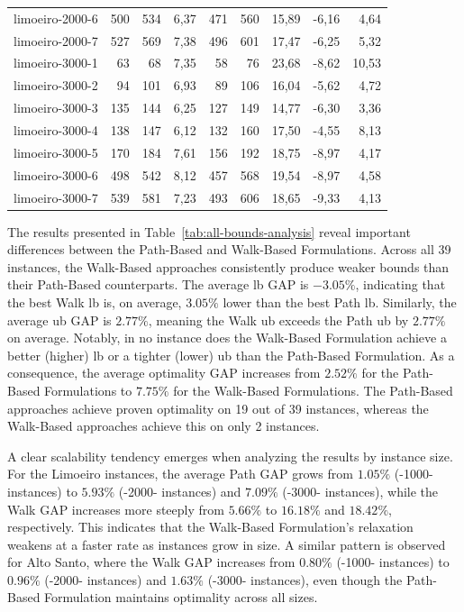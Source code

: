 \begin{table}[ht!]
{\begin{tabular}{lrrrrrrrr}
			limoeiro-2000-6                       & 500 & 534 & 6,37 & 471 & 560 & 15,89 & -6,16  & 4,64  \\
			limoeiro-2000-7                       & 527 & 569 & 7,38 & 496 & 601 & 17,47 & -6,25  & 5,32  \\
			limoeiro-3000-1                       & 63  & 68  & 7,35 & 58  & 76  & 23,68 & -8,62  & 10,53 \\
			limoeiro-3000-2                       & 94  & 101 & 6,93 & 89  & 106 & 16,04 & -5,62  & 4,72  \\
			limoeiro-3000-3                       & 135 & 144 & 6,25 & 127 & 149 & 14,77 & -6,30  & 3,36  \\
			limoeiro-3000-4                       & 138 & 147 & 6,12 & 132 & 160 & 17,50 & -4,55  & 8,13  \\
			limoeiro-3000-5                       & 170 & 184 & 7,61 & 156 & 192 & 18,75 & -8,97  & 4,17  \\
			limoeiro-3000-6                       & 498 & 542 & 8,12 & 457 & 568 & 19,54 & -8,97  & 4,58  \\
			limoeiro-3000-7                       & 539 & 581 & 7,23 & 493 & 606 & 18,65 & -9,33  & 4,13  \\ \hline
		\end{tabular}%
	}
\end{table}

The results presented in Table~\ref{tab:all-bounds-analysis} reveal important differences between the Path-Based and Walk-Based Formulations. Across all 39 instances, the Walk-Based approaches consistently produce weaker bounds than their Path-Based counterparts. The average \gls{lb} GAP is $-3.05\%$, indicating that the best Walk \gls{lb} is, on average, $3.05\%$ lower than the best Path \gls{lb}. Similarly, the average \gls{ub} GAP is $2.77\%$, meaning the Walk \gls{ub} exceeds the Path \gls{ub} by $2.77\%$ on average. Notably, in no instance does the Walk-Based Formulation achieve a better (higher) \gls{lb} or a tighter (lower) \gls{ub} than the Path-Based Formulation. As a consequence, the average optimality GAP increases from $2.52\%$ for the Path-Based Formulations to $7.75\%$ for the Walk-Based Formulations. The Path-Based approaches achieve proven optimality on 19 out of 39 instances, whereas the Walk-Based approaches achieve this on only 2 instances.

A clear scalability tendency emerges when analyzing the results by instance size. For the Limoeiro instances, the average Path GAP grows from $1.05\%$ (-1000- instances) to $5.93\%$ (-2000- instances) and $7.09\%$ (-3000- instances), while the Walk GAP increases more steeply from $5.66\%$ to $16.18\%$ and $18.42\%$, respectively. This indicates that the Walk-Based Formulation's relaxation weakens at a faster rate as instances grow in size. A similar pattern is observed for Alto Santo, where the Walk GAP increases from $0.80\%$ (-1000- instances) to $0.96\%$ (-2000- instances) and $1.63\%$ (-3000- instances), even though the Path-Based Formulation maintains optimality across all sizes.

